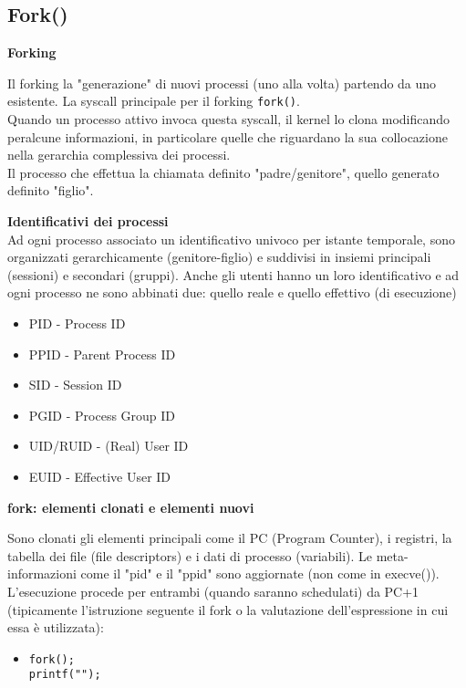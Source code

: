 \begin{flushleft}
  \subsection{Fork()}
  \begin{flushleft}
    \textbf{Forking} \par 
    Il forking \ace la "generazione" di nuovi processi (uno alla volta) partendo da uno 
    esistente. La syscall principale per il forking \ace \texttt{fork()}. \\
    Quando un processo attivo invoca questa syscall, il kernel lo clona modificando 
    per\aco alcune informazioni, in particolare quelle che riguardano la sua collocazione 
    nella gerarchia complessiva dei processi. \\
    Il processo che effettua la chiamata \ace definito "padre/genitore", quello generato \ace 
    definito "figlio". \par 
    \textbf{Identificativi dei processi}\\
    Ad ogni processo \ace associato un identificativo univoco per istante temporale, sono 
    organizzati gerarchicamente (genitore-figlio) e suddivisi in insiemi principali 
    (sessioni) e secondari (gruppi). Anche gli utenti hanno un loro identificativo e ad 
    ogni processo ne sono abbinati due: quello reale e quello effettivo (di esecuzione)
    \begin{itemize}
      \item PID - Process ID
      \item PPID - Parent Process ID
      \item SID - Session ID
      \item PGID - Process Group ID
      \item UID/RUID - (Real) User ID
      \item EUID - Effective User ID
    \end{itemize}
    \textbf{fork: elementi clonati e elementi nuovi} \par 
    Sono clonati gli elementi principali come il PC (Program Counter), i registri, la 
    tabella dei file (file descriptors) e i dati di processo (variabili). Le meta-informazioni 
    come il "pid" e il "ppid" sono aggiornate (non come in execve()). \\
    L'esecuzione procede per entrambi (quando saranno schedulati) da PC+1 
    (tipicamente l'istruzione seguente il fork o la valutazione dell'espressione in cui essa 
    è utilizzata):
    \begin{itemize}
      \item \texttt{fork();\\ printf("\n");} \\

\end{itemize}
\end{flushleft}
\end{flushleft}
